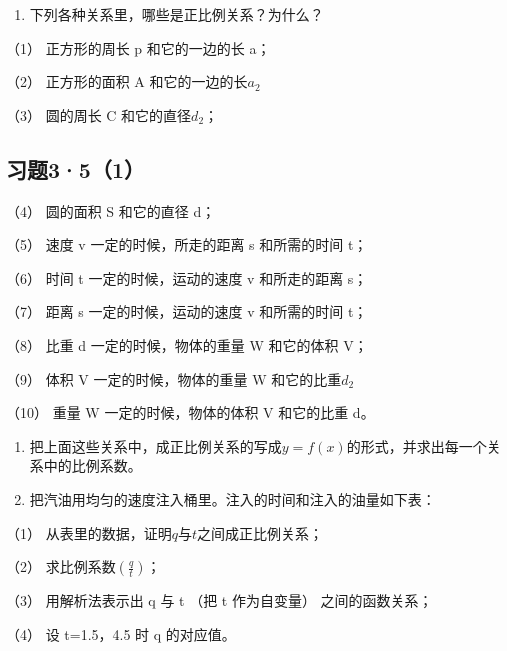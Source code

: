 \begin{enumerate}
\item
  下列各种关系里，哪些是正比例关系？为什么？
\end{enumerate}

（1） 正方形的周长 p 和它的一边的长 a；

（2） 正方形的面积 A 和它的一边的长\(a_{2}\)

（3） 圆的周长 C 和它的直径\(d_{2}\)；

\subsection{习题3·5（1）}

（4） 圆的面积 S 和它的直径 d；

（5） 速度 v 一定的时候，所走的距离 s 和所需的时间 t；

（6） 时间 t 一定的时候，运动的速度 v 和所走的距离 s；

（7） 距离 s 一定的时候，运动的速度 v 和所需的时间 t；

（8） 比重 d 一定的时候，物体的重量 W 和它的体积 V；

（9） 体积 V 一定的时候，物体的重量 W 和它的比重\(d_{2}\)

（10） 重量 W 一定的时候，物体的体积 V 和它的比重 d。

\begin{enumerate}[start=2]
\item
  把上面这些关系中，成正比例关系的写成\(y = f(x)\)的形式，并求出每一个关系中的比例系数。
\item
  把汽油用均匀的速度注入桶里。注入的时间和注入的油量如下表：
\end{enumerate}

{\centering
\small\setlength{\tabcolsep}{3pt}%
\par
}

（1） 从表里的数据，证明\(q\)与\(t\)之间成正比例关系；

（2） 求比例系数\(\left(\frac{q}{t}\right)\)；

（3） 用解析法表示出 q 与 t （把 t 作为自变量） 之间的函数关系；

（4） 设 t=1.5，4.5 时 q 的对应值。

